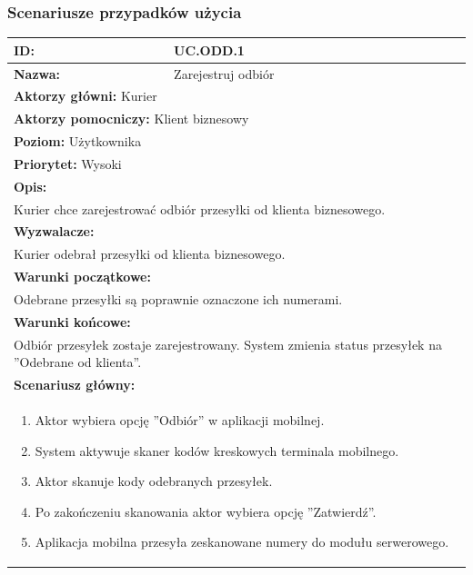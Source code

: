 \subsubsection*{Scenariusze przypadków użycia}
\begin{center}
\begin{longtable}[h]{|p{1.6cm}|p{13.5cm}|}
\hline
\textbf{ID:} & UC.ODD.1 \\ \hline
\textbf{Nazwa:} & Zarejestruj odbiór \\ \hline
\multicolumn{2}{|p{15.1cm}|}{\textbf{Aktorzy główni:} Kurier} \\
\multicolumn{2}{|p{15.1cm}|}{\textbf{Aktorzy pomocniczy:} 
Klient biznesowy} \\
\multicolumn{2}{|p{15.1cm}|}{\textbf{Poziom:} Użytkownika} \\
\multicolumn{2}{|p{15.1cm}|}{\textbf{Priorytet:} Wysoki} \\
\hline
\multicolumn{2}{|p{15.1cm}|}{\textbf{Opis:}} \\
\multicolumn{2}{|p{15.1cm}|}{
Kurier chce zarejestrować odbiór przesyłki od klienta biznesowego.
} \\ \hline
\multicolumn{2}{|p{15.1cm}|}{\textbf{Wyzwalacze:}} \\
\multicolumn{2}{|p{15.1cm}|}{
Kurier odebrał przesyłki od klienta biznesowego.
} \\ \hline
\multicolumn{2}{|p{15.1cm}|}{\textbf{Warunki początkowe:}} \\
\multicolumn{2}{|p{15.1cm}|}{
Odebrane przesyłki są poprawnie oznaczone ich numerami.
} \\ \hline
\multicolumn{2}{|p{15.1cm}|}{\textbf{Warunki końcowe:}} \\
\multicolumn{2}{|p{15.1cm}|}{
Odbiór przesyłek zostaje zarejestrowany. System zmienia status przesyłek na ''Odebrane od klienta''.
} \\ \hline
\multicolumn{2}{|p{15.1cm}|}{\textbf{Scenariusz główny:}} \\
\multicolumn{2}{|p{15.1cm}|}{
\begin{enumerate}
\item Aktor wybiera opcję ''Odbiór'' w aplikacji mobilnej.
\item System aktywuje skaner kodów kreskowych terminala mobilnego.
\item Aktor skanuje kody odebranych przesyłek.
\item Po zakończeniu skanowania aktor wybiera opcję ''Zatwierdź''.
\item Aplikacja mobilna przesyła zeskanowane numery do modułu serwerowego.

\end{enumerate}}
\end{longtable}
\end{center}
